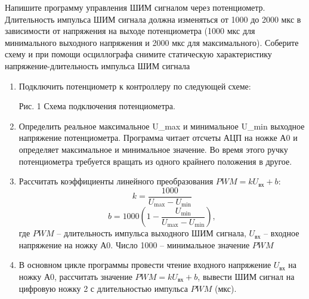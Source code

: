 
Напишите программу управления ШИМ сигналом через потенциометр. Длительность импульса ШИМ сигнала должна изменяться от 1000 до 2000 мкс в зависимости от напряжения на выходе потенциометра (1000 мкс для минимального выходного напряжения и 2000 мкс для максимального). Соберите схему и при помощи осциллографа снимите статическую характеристику напряжение-длительность импульса ШИМ сигнала

\solutionSection

\begin{enumerate}
    \item Подключить потенциометр к контроллеру по следующей схеме:
          \begin{center}
            Рис. 1 Схема подключения потенциометра.
          \end{center}
          
    \item Определить реальное максимальное U\_max и минимальное U\_min выходное напряжение потенциометра. Программа читает отсчеты АЦП на ножке А0 и определяет максимальное и минимальное значение. Во время этого ручку потенциометра требуется вращать из одного крайнего положения в другое.
    \item Рассчитать коэффициенты линейного преобразования $PWM=kU_\text{вх}+b$:
    $$k=\frac{1000}{U_\text{max}-U_\text{min}}$$
    $$b=1000\left(1-\frac{U_\text{min}}{U_\text{max}-U_\text{min}}\right),$$
    где $PWM$ – длительность импульса выходного ШИМ сигнала, $U_\text{вх}$ – входное напряжение на ножку А0. Число 1000 – минимальное значение $PWM$
    \item В основном цикле программы провести чтение входного напряжение $U_\text{вх}$ на ножку А0, рассчитать значение $PWM=kU_\text{вх}+b$, вывести ШИМ сигнал на цифровую ножку 2 с длительностью импульса $PWM$ (мкс).
\end{enumerate}

